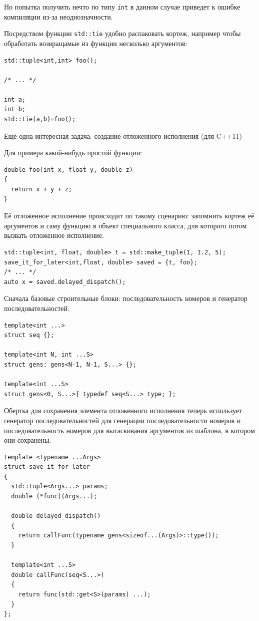 \documentclass[a4paper,12pt,oneside]{article}
\begin{document}
Но попытка получить нечто по типу \lstinline!int! в данном случае приведет к ошибке компиляции из-за неоднозначности.

Посредством функции \lstinline!std::tie! удобно распаковать кортеж, например чтобы обработать возвращамые из функции несколько аргументов:

\begin{lstlisting}
std::tuple<int,int> foo();

/* ... */

int a;
int b;
std::tie(a,b)=foo();
\end{lstlisting}

Ещё одна интересная задача: создание отложенного исполнения (для C++11)

Для примера какой-нибудь простой функции:

\begin{lstlisting}
double foo(int x, float y, double z)
{
  return x + y + z;
}
\end{lstlisting}

Её отложенное исполнение происходит по такому сценарию: запомнить кортеж её аргументов и саму функцию в объект специального класса, для которого потом вызвать отложенное исполнение.

\begin{lstlisting}
std::tuple<int, float, double> t = std::make_tuple(1, 1.2, 5);
save_it_for_later<int,float, double> saved = {t, foo};
/* ... */
auto x = saved.delayed_dispatch();
\end{lstlisting}

Сначала базовые строительные блоки: последовательность номеров и генератор последовательностей.

\begin{lstlisting}
template<int ...> 
struct seq {};

template<int N, int ...S> 
struct gens: gens<N-1, N-1, S...> {};

template<int ...S> 
struct gens<0, S...>{ typedef seq<S...> type; };
\end{lstlisting}

Обертка для сохранения элемента отложенного исполнения теперь использует генератор последовательностей для генерации последовательности номеров и последовательность номеров для вытаскивания аргументов из шаблона, в котором они сохранены.

\begin{lstlisting}
template <typename ...Args>
struct save_it_for_later
{
  std::tuple<Args...> params;
  double (*func)(Args...);

  double delayed_dispatch()
  {
    return callFunc(typename gens<sizeof...(Args)>::type());
  }

  template<int ...S>
  double callFunc(seq<S...>)
  {
    return func(std::get<S>(params) ...);
  }
};
\end{lstlisting}
\end{document}
